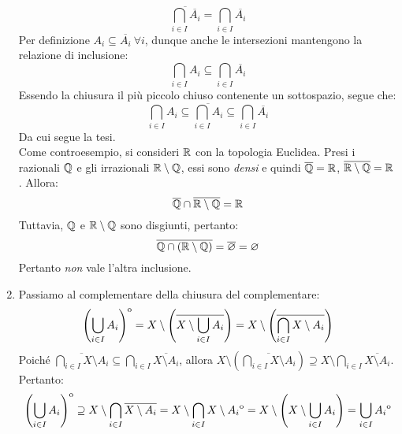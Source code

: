 \begin{demonstration}
\begin{enumerate}[label=\Roman*]
\begin{equation*}
	\overline{\bigcap_{i\in I}\overline{A_i}}=\bigcap_{i\in I}\overline{A_i}
\end{equation*}
Per definizione $A_i\subseteq\overline{A_i}\ \forall i$, dunque anche le intersezioni mantengono la relazione di inclusione:
\begin{equation*}
	\bigcap_{i\in I}A_i\subseteq\bigcap_{i\in I}\overline{A_i}
\end{equation*}
Essendo la chiusura il più piccolo chiuso contenente un sottospazio, segue che:
\begin{equation*}
	\bigcap_{i\in I}A_i\subseteq\overline{\bigcap_{i\in I}A_i}\subseteq\bigcap_{i\in I}\overline{A_i}
\end{equation*}
Da cui segue la tesi.\\
Come controesempio, si consideri $\mathbb{R}$ con la topologia Euclidea. Presi i razionali $\mathbb{Q}$ e gli irrazionali $\mathbb{R}\setminus\mathbb{Q}$, essi sono \textit{densi} e quindi $\overline{\mathbb{Q}}=\mathbb{R}$, $\overline{\mathbb{R}\setminus\mathbb{Q}}=\mathbb{R}$. Allora:
\begin{equation*}
	\overline{\mathbb{Q}}\cap\overline{\mathbb{R}\setminus\mathbb{Q}}=\mathbb{R}
\end{equation*}
Tuttavia, $\mathbb{Q}$ e $\mathbb{R}\setminus\mathbb{Q}$ sono disgiunti, pertanto:
\begin{equation*}
	\overline{\mathbb{Q}\cap\left(\mathbb{R}\setminus\mathbb{Q}\right)}=\overline{\varnothing}=\varnothing
\end{equation*}
Pertanto \textit{non} vale l'altra inclusione.
\item Passiamo al complementare della chiusura del complementare:
\begin{equation*}
{\kern0pt\left(\bigcup_{i\in I}A_i\right)}^{\mathrm{o}}=X\setminus\left(\overline{X\setminus \bigcup_{i\in I}A_i}\right)=X\setminus\left(\overline{\bigcap_{i\in I}X\setminus A_i}\right)
\end{equation*}
Poiché $\displaystyle \overline{\bigcap_{i\in I}X\setminus A_i}\subseteq \bigcap_{i\in I}\overline{X\setminus A_i}$, allora $\displaystyle X\setminus\left(\overline{\bigcap_{i\in I}X\setminus A_i}\right) \supseteq X\setminus\bigcap_{i\in I}\overline{X\setminus A_i}$. Pertanto:
\begin{equation*}
{\kern0pt\left(\bigcup_{i\in I}A_i\right)}^{\mathrm{o}}\supseteq X\setminus\bigcap_{i\in I}\overline{X\setminus A_i}=X\setminus\bigcap_{i\in I}X\setminus {\kern0ptA_i}^{\mathrm{o}}=X\setminus\left(X\setminus\bigcup_{i\in I}A_i \right)=\bigcup_{i\in I}{\kern0ptA_i}^{\mathrm{o}}
\end{equation*}

\end{enumerate}
\end{demonstration}
